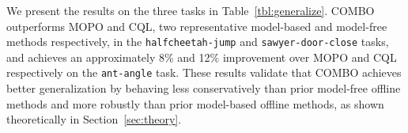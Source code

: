 \begin{table}[t]
\centering
\vspace{-0.2cm}
\caption{
\footnotesize Average returns of \texttt{halfcheetah-jump} and \texttt{ant-angle} and average success rate of \texttt{sawyer-door-close} that require out-of-distribution generalization. All results are averaged over 3 random seeds. We include the mean and max undiscounted return / success rate of the episodes in the batch data (under Batch Mean and Batch Max, respectively) for comparison.
}
\vspace*{0.2cm}
\scriptsize
{}
\vspace{-0.7cm}
\label{tbl:generalize}
\normalsize
\end{table}


We present the results on the three tasks in Table~\ref{tbl:generalize}. COMBO outperforms MOPO and CQL, two representative model-based and model-free methods respectively, in the \texttt{halfcheetah-jump} and \texttt{sawyer-door-close} tasks, and achieves an approximately 8\% and 12\% improvement over MOPO and CQL respectively on the \texttt{ant-angle} task. These results validate that COMBO achieves better generalization by behaving less conservatively than prior model-free offline methods and more robustly than prior model-based offline methods, as shown theoretically in Section~\ref{sec:theory}.

